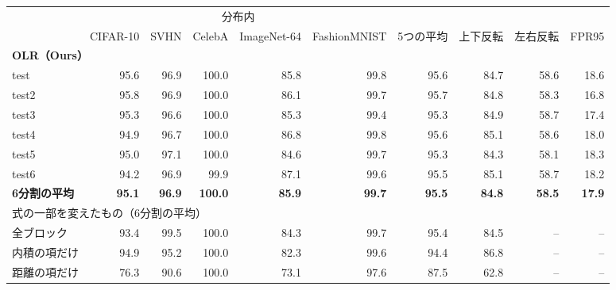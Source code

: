 \documentclass[border=3pt]{standalone}
\begin{document}
%
\begin{tabular}{l*{5}{r}rrrr}%
\toprule
 & \multicolumn{5}{c}{分布内} & & & & \\
\cmidrule(lr){2-6}
 & CIFAR-10 & SVHN & CelebA & ImageNet-64 & FashionMNIST & 5つの平均 & 上下反転 & 左右反転 & FPR95\\
\midrule
\multicolumn{10}{l}{\textbf{OLR（Ours）}}\\
\quad  test & 95.6 & 96.9 & 100.0 & 85.8 & 99.8 & 95.6 & 84.7 & 58.6 & 18.6\\
\quad  test2 & 95.8 & 96.9 & 100.0 & 86.1 & 99.7 & 95.7 & 84.8 & 58.3 & 16.8\\
\quad  test3 & 95.3 & 96.6 & 100.0 & 85.3 & 99.4 & 95.3 & 84.9 & 58.7 & 17.4\\
\quad  test4 & 94.9 & 96.7 & 100.0 & 86.8 & 99.8 & 95.6 & 85.1 & 58.6 & 18.0\\
\quad  test5 & 95.0 & 97.1 & 100.0 & 84.6 & 99.7 & 95.3 & 84.3 & 58.1 & 18.3\\
\quad  test6 & 94.2 & 96.9 & 99.9 & 87.1 & 99.6 & 95.5 & 85.1 & 58.7 & 18.2\\
\quad  \textbf{6分割の平均} & \textbf{95.1} & \textbf{96.9} & \textbf{100.0} & \textbf{85.9} & \textbf{99.7} & \textbf{95.5} & \textbf{84.8} & \textbf{58.5} & \textbf{17.9}\\
\midrule
\multicolumn{10}{l}{式の一部を変えたもの（6分割の平均）}\\
\quad  全ブロック & 93.4 & 99.5 & 100.0 & 84.3 & 99.7 & 95.4 & 84.5 & – & –\\
\quad  内積の項だけ & 94.9 & 95.2 & 100.0 & 82.3 & 99.6 & 94.4 & 86.8 & – & –\\
\quad  距離の項だけ & 76.3 & 90.6 & 100.0 & 73.1 & 97.6 & 87.5 & 62.8 & – & –\\
\bottomrule
\end{tabular}%
\end{document}
